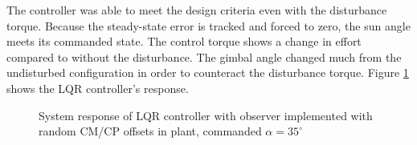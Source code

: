 \documentclass[]{aiaa-tc}%
\begin{document}
	The controller was able to meet the design criteria even with the disturbance torque. Because the steady-state error is tracked and forced to zero, the sun angle meets its commanded state. The control torque shows a change in effort compared to without the disturbance. The gimbal angle changed much from the undisturbed configuration in order to counteract the disturbance torque. Figure \ref{fig:LQR_MC} shows the LQR controller's response.

	\begin{figure}[H]
		\centering
		\caption{System response of LQR controller with observer implemented with random CM/CP offsets in plant, commanded $\alpha=35^{\circ}$ }
		\label{fig:LQR_MC}
	\end{figure}	
\end{document}
